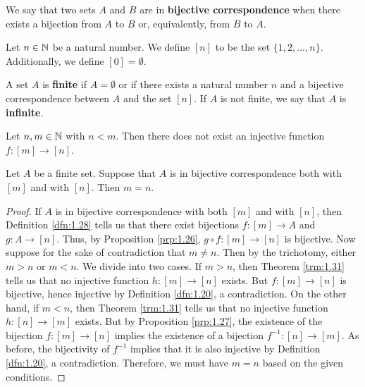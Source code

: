 \documentclass[../main.tex]{subfiles}
\begin{document}
\begin{definition}\label{dfn:1.28}
    We say that two sets $A$ and $B$ are in \textbf{bijective correspondence} when there exists a bijection from $A$ to $B$ or, equivalently, from $B$ to $A$.
\end{definition}

\begin{definition}\label{dfn:1.29}
    Let $n\in\mathbb{N}$ be a natural number. We define $[n]$ to be the set $\{1,2,\dots,n\}$. Additionally, we define $[0]=\emptyset$.
\end{definition}

\begin{definition}\label{dfn:1.30}
    A set $A$ is \textbf{finite} if $A=\emptyset$ or if there exists a natural number $n$ and a bijective correspondence between $A$ and the set $[n]$. If $A$ is not finite, we say that $A$ is \textbf{infinite}.
\end{definition}

\begin{theorem}\label{trm:1.31}
    Let $n,m\in\mathbb{N}$ with $n<m$. Then there does not exist an injective function $f:[m]\to[n]$.
\end{theorem}

\begin{theorem}\label{trm:1.32}
    Let $A$ be a finite set. Suppose that $A$ is in bijective correspondence both with $[m]$ and with $[n]$. Then $m=n$.
    \begin{proof}
        If $A$ is in bijective correspondence with both $[m]$ and with $[n]$, then Definition \ref{dfn:1.28} tells us that there exist bijections $f:[m]\to A$ and $g:A\to[n]$. Thus, by Proposition \ref{prp:1.26}, $g\circ f:[m]\to[n]$ is bijective. Now suppose for the sake of contradiction that $m\neq n$. Then by the trichotomy, either $m>n$ or $m<n$. We divide into two cases. If $m>n$, then Theorem \ref{trm:1.31} tells us that no injective function $h:[m]\to[n]$ exists. But $f:[m]\to[n]$ is bijective, hence injective by Definition \ref{dfn:1.20}, a contradiction. On the other hand, if $m<n$, then Theorem \ref{trm:1.31} tells us that no injective function $h:[n]\to[m]$ exists. But by Proposition \ref{prp:1.27}, the existence of the bijection $f:[m]\to[n]$ implies the existence of a bijection $f^{-1}:[n]\to[m]$. As before, the bijectivity of $f^{-1}$ implies that it is also injective by Definition \ref{dfn:1.20}, a contradiction. Therefore, we must have $m=n$ based on the given conditions. 
    \end{proof}
\end{theorem}
\end{document}
